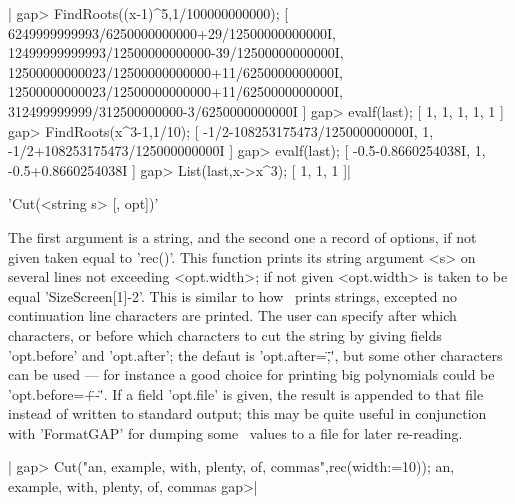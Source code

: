 |    gap> FindRoots((x-1)^5,1/100000000000);
    [ 6249999999993/6250000000000+29/12500000000000I, 
      12499999999993/12500000000000-39/12500000000000I, 
      12500000000023/12500000000000+11/6250000000000I, 
      12500000000023/12500000000000+11/6250000000000I, 
      312499999999/312500000000-3/6250000000000I ]
    gap> evalf(last);
    [ 1, 1, 1, 1, 1 ]
    gap> FindRoots(x^3-1,1/10);            
    [ -1/2-108253175473/125000000000I, 1, -1/2+108253175473/125000000000I ]
    gap> evalf(last);
    [ -0.5-0.8660254038I, 1, -0.5+0.8660254038I ]
    gap> List(last,x->x^3);
    [ 1, 1, 1 ]|


'Cut(<string s> [, opt])'

The  first argument is a string, and the second one a record of options, if
not  given taken equal to 'rec()'. This function prints its string argument
<s> on several lines not exceeding <opt.width>; if not given <opt.width> is
taken  to be equal  'SizeScreen[1]-2'. This is  similar to how \GAP\ prints
strings, excepted no continuation line characters are printed. The user can
specify  after  which  characters,  or  before  which characters to cut the
string  by  giving  fields  'opt.before'  and  'opt.after';  the  defaut is
'opt.after\:=\",\"', but some other characters can be used --- for instance
a  good choice for printing big polynomials could be 'opt.before\:=\"+-\"'.
If a field 'opt.file' is given, the result is appended to that file instead
of written to standard output; this may be quite useful in conjunction with
'FormatGAP' for dumping some \GAP\ values to a file for later re-reading.

|    gap> Cut("an, example, with, plenty, of, commas\n",rec(width:=10));
    an,
    example,
    with,
    plenty,
    of,
    commas
    gap>|

